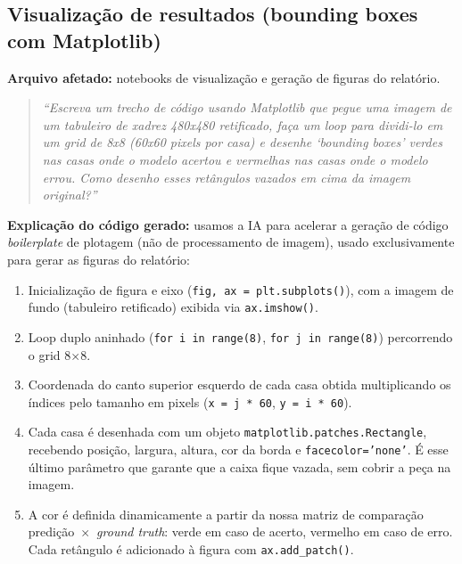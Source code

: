 \subsection{Visualização de resultados (bounding boxes com Matplotlib)}
\label{sec:declaracao-ia-viz}

\textbf{Arquivo afetado:} notebooks de visualização e geração de figuras do relatório.

\begin{quote}
\itshape
``Escreva um trecho de código usando Matplotlib que pegue uma imagem de um tabuleiro
de xadrez 480x480 retificado, faça um loop para dividi-lo em um grid de 8x8 (60x60
pixels por casa) e desenhe `bounding boxes' verdes nas casas onde o modelo acertou e
vermelhas nas casas onde o modelo errou. Como desenho esses retângulos vazados em cima
da imagem original?''
\end{quote}

\textbf{Explicação do código gerado:} usamos a IA para acelerar a geração de código
\textit{boilerplate} de plotagem (não de processamento de imagem), usado exclusivamente
para gerar as figuras do relatório:
\begin{enumerate}[nosep]
  \item Inicialização de figura e eixo (\texttt{fig, ax = plt.subplots()}), com a imagem
        de fundo (tabuleiro retificado) exibida via \texttt{ax.imshow()}.
  \item Loop duplo aninhado (\texttt{for i in range(8)}, \texttt{for j in range(8)})
        percorrendo o grid 8$\times$8.
  \item Coordenada do canto superior esquerdo de cada casa obtida multiplicando os
        índices pelo tamanho em pixels (\texttt{x = j * 60}, \texttt{y = i * 60}).
  \item Cada casa é desenhada com um objeto
        \texttt{matplotlib.patches.Rectangle}, recebendo posição, largura, altura, cor
        da borda e \texttt{facecolor='none'}. É esse último parâmetro que garante que a
        caixa fique vazada, sem cobrir a peça na imagem.
  \item A cor é definida dinamicamente a partir da nossa matriz de comparação
        predição~$\times$~\textit{ground truth}: verde em caso de acerto, vermelho em
        caso de erro. Cada retângulo é adicionado à figura com \texttt{ax.add\_patch()}.
\end{enumerate}

